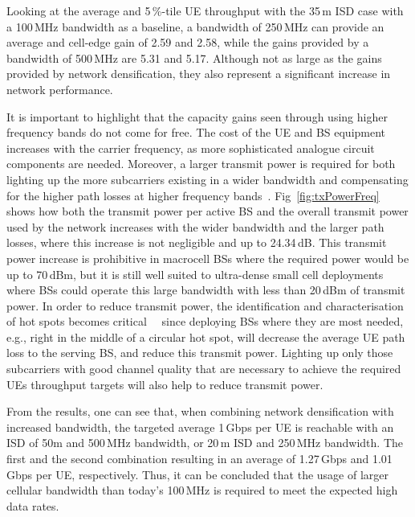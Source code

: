 \documentclass{IEEEtran}
\begin{document}
Looking at the average and 5\,\%-tile \ac{UE} throughput with the 35\,m \ac{ISD} case with a 100\,MHz bandwidth as a baseline,
a bandwidth of 250\,MHz can provide an average and cell-edge gain of 2.59 and 2.58,
while the gains provided by a bandwidth of 500\,MHz are 5.31 and 5.17.
Although not as large as the gains provided by network densification,
they also represent a significant increase in network performance.

It is important to highlight that the capacity gains seen through using higher frequency bands do not come for free.
The cost of the \ac{UE} and \ac{BS} equipment increases with the carrier frequency,
as more sophisticated analogue circuit components are needed.
Moreover, a larger transmit power is required for both lighting up the more subcarriers existing in a wider bandwidth
and compensating for the higher path losses at higher frequency bands~\cite{6472194}.
Fig~\ref{fig:txPowerFreq} shows how both the transmit power per active \ac{BS} and the overall transmit power used by the network increases with the wider bandwidth and the larger path losses,
where this increase is not negligible and up to 24.34\,dB.
This transmit power increase is prohibitive in macrocell \acp{BS} where the required power would be up to 70\,dBm,
but it is still well suited to ultra-dense small cell deployments
where \acp{BS} could operate this large bandwidth with less than 20\,dBm of transmit power.
In order to reduce transmit power,
the identification and characterisation of hot spots becomes critical~\cite{1458284}~\cite{KlessigTrafficModelling}
since deploying \acp{BS} where they are most needed,
e.g., right in the middle of a circular hot spot,
will decrease the average \ac{UE} path loss to the serving \ac{BS},
and reduce this transmit power.
Lighting up only those subcarriers with good channel quality that are necessary to achieve the required \acp{UE} throughput targets will also help to reduce transmit power.


From the results,
one can see that, when combining network densification with increased bandwidth, the targeted average 1\,Gbps per \ac{UE} is reachable with an \ac{ISD} of 50m and 500\,MHz bandwidth,
or 20\,m \ac{ISD} and 250\,MHz bandwidth.
The first and the second combination resulting in an average of 1.27\,Gbps and 1.01\,Gbps per \ac{UE},
respectively.
Thus, it can be concluded that the usage of larger cellular bandwidth than today's 100\,MHz is required
to meet the expected high data rates.
\end{document}
